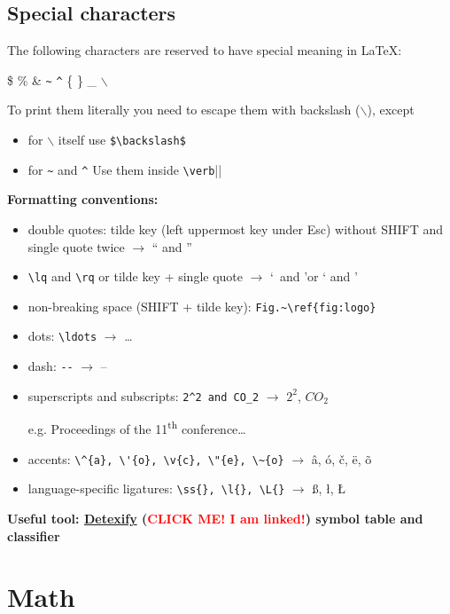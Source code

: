 \documentclass[a4paper,11pt,leqno]{article}
\begin{document}
\subsection{Special characters}
The following characters are reserved to have special meaning in \LaTeX:

\$ \% \& \verb|~| \verb|^| \{ \} \_ $\backslash$ 

To print them literally you need to escape them with backslash ($\backslash$), except
\begin{itemize}
	\item for $\backslash$ itself use \verb|$\backslash$|
	\item for \verb|~| and \verb|^| Use them inside \verb|\verb||| 
\end{itemize}

\textbf{Formatting conventions:}

\begin{itemize}
	\item double quotes: tilde key (left uppermost key under Esc) without SHIFT and single quote twice $\rightarrow$ `` and ''
	\item \verb|\lq| and \verb|\rq| or tilde key + single quote $\rightarrow$ \lq~and \rq or ` and '
	\item non-breaking space (SHIFT + tilde key): \verb|Fig.~\ref{fig:logo}|
	\item dots: \verb|\ldots| $\rightarrow$ \ldots
	\item dash: \verb|--| $\rightarrow$ --
	\item superscripts and subscripts: \verb|2^2 and CO_2| $\rightarrow$ $2^2$, $CO_2$
	
	e.g. Proceedings of the 11\textsuperscript{th} conference\ldots
	
	\item accents: \verb|\^{a}, \'{o}, \v{c}, \"{e}, \~{o}| $\rightarrow$ \^{a}, \'{o}, \v{c}, \"{e}, \~{o}
	\item language-specific ligatures: \verb|\ss{}, \l{}, \L{}| $\rightarrow$ \ss{}, \l{}, \L{}
\end{itemize}

\textbf{Useful tool: \href{http://detexify.kirelabs.org/symbols.html}{Detexify} (\textcolor{red}{CLICK ME! I am linked!}) symbol table and classifier}

\section{Math}
\end{document}
